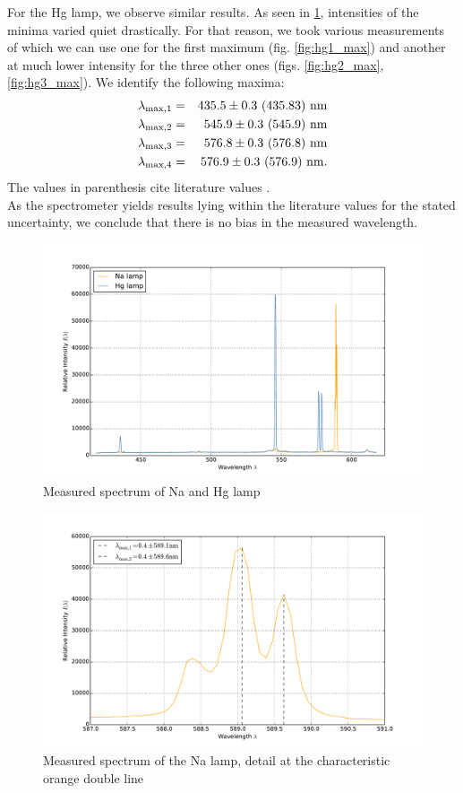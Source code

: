 For the Hg lamp, we observe similar results. As seen in \ref{fig:spectrum_all}, intensities 
of the minima varied quiet drastically. For that reason, we took various measurements of which 
we can use one for the first maximum (fig. \ref{fig:hg1_max}) and another at much lower 
intensity for the three other ones (figs. \ref{fig:hg2_max}, \ref{fig:hg3_max}). 
We identify the following maxima:
\begin{eqnarray*}
    \lambda_\mathrm{max, 1} &=& 435.5 \pm 0.3 \ (435.83)\ \mathrm{nm} \\
    \lambda_\mathrm{max, 2} &=& 545.9 \pm 0.3 \ (545.9)\ \mathrm{nm} \\
    \lambda_\mathrm{max, 3} &=& 576.8 \pm 0.3 \ (576.8)\ \mathrm{nm} \\
    \lambda_\mathrm{max, 4} &=& 576.9 \pm 0.3 \ (576.9)\ \mathrm{nm}.
\end{eqnarray*}
The values in parenthesis cite literature values \cite{nist}. \\
As the spectrometer yields results lying within the literature values for the 
stated uncertainty, we conclude that there is no bias in the measured wavelength.

\begin{figure}
\centering
\includegraphics[width=\pltw]{analysis/figures/spectrum_all.pdf}
\caption{Measured spectrum of Na and Hg lamp}
\label{fig:spectrum_all}
\end{figure}

\begin{figure}
\centering
\includegraphics[width=\pltw]{analysis/figures/na_max.pdf}
\caption{Measured spectrum of the Na lamp, detail at the 
characteristic orange double line}
\label{fig:na_max}
\end{figure}

